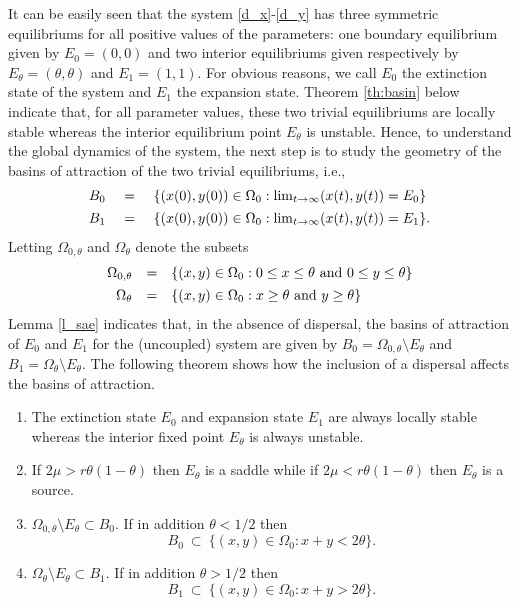 \indent It can be easily seen that the system \eqref{d_x}-\eqref{d_y} has three symmetric equilibriums for all positive values of the
 parameters:
 one boundary equilibrium given by $E_0 = (0, 0)$ and two interior equilibriums given respectively by $E_{\theta} = (\theta, \theta)$
 and $E_1 = (1, 1)$.
 For obvious reasons, we call $E_0$ the extinction state of the system and $E_1$ the expansion state.
 Theorem \ref{th:basin} below indicate that, for all parameter values, these two trivial equilibriums are locally stable whereas the
 interior equilibrium point $E_{\theta}$ is unstable.
 Hence, to understand the global dynamics of the system, the next step is to study the geometry of the basins of attraction of the
 two trivial equilibriums, i.e.,
 $$ \begin{array}{rcl}
     B_0 \ & = & \ \{(x (0), y (0)) \in \Omega_0 : \lim_{t {{\rightarrow}} \infty} (x (t), y (t)) = E_0 \} \vspace{4pt} \\
     B_1 \ & = & \ \{(x (0), y (0)) \in \Omega_0 : \lim_{t {{\rightarrow}} \infty} (x (t), y (t)) = E_1 \}. \end{array} $$
 Letting $\Omega_{0, \theta}$ and $\Omega_{\theta}$ denote the subsets
 $$ \begin{array}{rcl}
    \Omega_{0, \theta} & = & \{(x, y) \in \Omega_0 : 0 \leq x \leq \theta \ \hbox{and} \ 0 \leq y \leq \theta \} \vspace{4pt} \\
    \Omega_{\theta}    & = & \{(x, y) \in \Omega_0 : x \geq \theta \ \hbox{and} \ y \geq \theta \} \end{array} $$
 Lemma \ref{l_sae} indicates that, in the absence of dispersal, the basins of attraction of $E_0$ and $E_1$ for the (uncoupled) system
 are given by $B_0 = \Omega_{0, \theta} \setminus E_{\theta}$ and $B_1 = \Omega_{\theta} \setminus E_{\theta}$.
 The following theorem shows how the inclusion of a dispersal affects the basins of attraction.
\begin{theorem}
\label{th:basin}
\begin{enumerate}
 \item The extinction state $E_0$ and expansion state $E_1$ are always locally stable whereas the interior fixed point
  $E_{\theta}$ is always unstable. \vspace{4pt}
 \item If $2 \mu > r \theta (1 - \theta)$ then $E_{\theta}$ is a saddle while if $2 \mu < r \theta (1 - \theta)$ then
  $E_{\theta}$ is a source. \vspace{4pt}
 \item $\Omega_{0, \theta} \setminus E_{\theta} \subset B_0$.
  If in addition $\theta < 1/2$ then
  $$ B_0 \ \subset \ \{(x, y) \in \Omega_0 : x + y < 2 \theta \}. $$
 \item $\Omega_{\theta}\setminus E_{\theta} \subset B_1$.
  If in addition $\theta > 1/2$ then
  $$ B_1 \ \subset \ \{(x, y) \in \Omega_0 : x + y > 2 \theta \}. $$
\end{enumerate}
\end{theorem}
